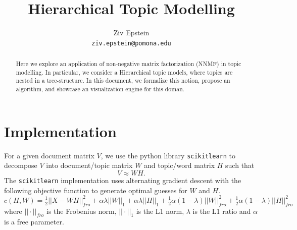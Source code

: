 \documentclass[12pt]{article}
\begin{document}
\nocite{*}

\title{Hierarchical Topic Modelling}


\author{Ziv Epstein \\ 
	\texttt{ziv.epstein@pomona.edu}}

\maketitle

\begin{abstract}
Here we explore an application of non-negative matrix factorization (NNMF) in topic modelling. In particular, we consider a Hierarchical topic models, where topics are nested in a tree-structure. In this document, we formalize this notion, propose an algorithm, and showcase an visualization engine for this doman.
\end{abstract}

\section{Implementation}
For a given document matrix $V$, we use the python library \texttt{scikitlearn} to decompose $V$ into document/topic matrix $W$ and topic/word matrix $H$ such that $$V \approx WH.$$ The  \texttt{scikitlearn} implementation uses alternating gradient descent with the following objective function to generate optimal guesses for $W$ and $H$.
$$c(H,W) = \tfrac{1}{2} ||X-WH||_{fro}^2 + \alpha \lambda ||W||_1 + \alpha \lambda ||H||_1 + \tfrac{1}{2} \alpha (1-\lambda) ||W||^2_{fro} + \tfrac{1}{2} \alpha (1-\lambda) ||H||^2_{fro}  $$
where $||\cdot||_{fro}$ is the Frobenius norm, $||\cdot||_{1}$ is the L1 norm, $\lambda$ is the L1 ratio and $\alpha$ is a free parameter. 
\end{document}
